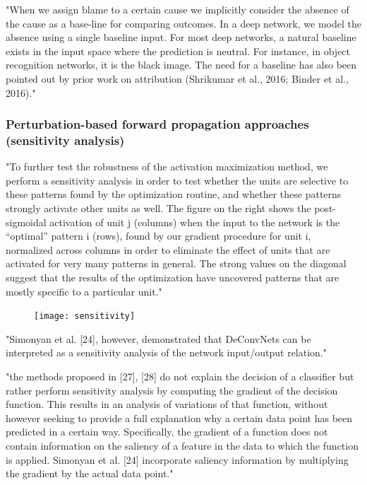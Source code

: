 	"When we assign blame to a certain cause we implicitly consider the absence of the cause as a base-line for comparing outcomes. In a deep network, we model the absence using a single baseline input. For most deep networks, a natural baseline exists in the input space where the prediction is neutral. For instance, in object recognition networks, it is the black image. The need for a baseline has	also been pointed out by prior work on attribution (Shrikumar et al., 2016; Binder et al., 2016)." \cite{Sundararajan2017}
		
		\subsubsection{Perturbation-based forward propagation approaches (sensitivity analysis)}
		"To further test the robustness of the activation maximization method, we perform a sensitivity analysis in order to test whether the units are selective to these patterns found by the optimization routine, and whether these patterns strongly activate other units as well. The figure on the right shows the post-sigmoidal activation of unit j (columns) when the input to the network is the “optimal” pattern i (rows), found by our gradient procedure for unit i, normalized across columns in order to eliminate the effect of units that are activated for very many patterns in general. The strong values on the diagonal suggest that the results of the optimization have uncovered patterns that are mostly specific to a particular unit." \cite{Erhan2009}
		\begin{figure}[h]
			\centering
			\texttt{[image: sensitivity]}
		\end{figure}
		
		"Simonyan et al. [24], however, demonstrated that DeConvNets can be interpreted as a sensitivity analysis of the network input/output relation." \cite{Mahendran2015}
		
		"the methods proposed in [27], [28] do not explain the decision of a classifier but rather perform sensitivity analysis by computing the gradient of the decision function. This results in an analysis of variations of that function, without however seeking to provide a full explanation why a certain data point has been predicted in a certain way. Specifically, the gradient of a function does not contain information on the saliency of a feature in the data to which the function is applied. Simonyan et al. [24] incorporate saliency information by multiplying the gradient by the actual data point." \cite{Montavon2017}
		
